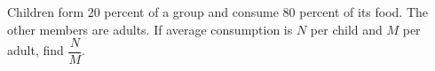 Children form 20 percent of a group and consume 80 percent of its food. The other members are adults. If average consumption is $N$ per child and $M$ per adult, find $\dfrac{N}{M}$.
